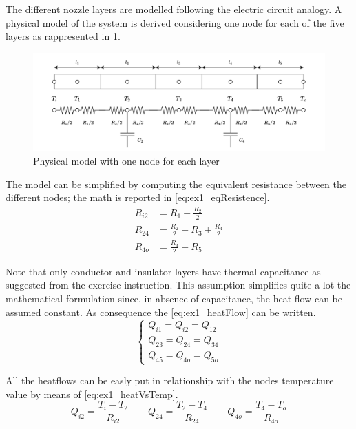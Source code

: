 \documentclass[11pt,a4paper,oneside]{article}
\begin{document}
The different nozzle layers are modelled following the electric circuit analogy. 
A physical model of the system is derived considering one node for each of the five layers as rappresented in \cref{fig:ex1_phyModelCase1}.
\begin{figure}[H]
    \centering
    \includegraphics[width=1\textwidth]{Figures/ex1_phyModelCase1.pdf}
    \caption[]{\label{fig:ex1_phyModelCase1} Physical model with one node for each layer}
\end{figure}

The model can be simplified by computing the equivalent resistance between the different nodes; the math is reported in \cref{eq:ex1_eqResistence}.
\begin{subequations}
    \begin{align}
        R_{i2} &= R_1 + \frac{R_2}{2}                   \label{eq:ex1_Ri2} \\
        R_{24} &= \frac{R_2}{2} + R_3 + \frac{R_4}{2}   \label{eq:ex1_R24} \\
        R_{4o} &= \frac{R_4}{2} + R_5                   \label{eq:ex1_R4o}
    \end{align}
    \label{eq:ex1_eqResistence}
\end{subequations}

Note that only conductor and insulator layers have thermal capacitance as suggested from the exercise instruction.
This assumption simplifies quite a lot the mathematical formulation since, in absence of capacitance, the heat flow can be assumed constant.
As consequence the \cref{eq:ex1_heatFlow} can be written.
\begin{equation}
    \begin{cases}
        Q_{i1} = Q_{i2} = Q_{12} \\
        Q_{23} = Q_{24} = Q_{34} \\
        Q_{45} = Q_{4o} = Q_{5o} 
    \end{cases}
    \label{eq:ex1_heatFlow}
\end{equation}

All the heatflows can be easly put in relationship with the nodes temperature value by means of \cref{eq:ex1_heatVsTemp}.
\begin{equation}
    Q_{i2} = \frac{T_i-T_2}{R_{i2}}  \qquad Q_{24} = \frac{T_2-T_4}{R_{24}}  \qquad Q_{4o} = \frac{T_4-T_o}{R_{4o}}
    \label{eq:ex1_heatVsTemp}
\end{equation}
\end{document}
